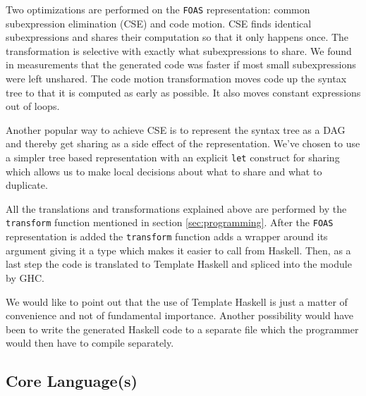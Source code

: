 \documentclass[preprint]{sigplanconf}
\begin{document}
Two optimizations are performed on the \texttt{FOAS} representation:
common subexpression elimination (CSE) and code motion. CSE finds
identical subexpressions and shares their computation so that it only
happens once. The transformation is selective with exactly what
subexpressions to share. We found in measurements that the generated
code was faster if most small subexpressions were left unshared. The
code motion transformation moves code up the syntax tree to that it is
computed as early as possible. It also moves constant expressions out of
loops.

Another popular way to achieve CSE is to represent the syntax tree as a
DAG and thereby get sharing as a side effect of the representation.
We've chosen to use a simpler tree based representation with an explicit
\texttt{let} construct for sharing which allows us to make local
decisions about what to share and what to duplicate.

All the translations and transformations explained above are performed
by the \texttt{transform} function mentioned in section
\ref{sec:programming}. After the \texttt{FOAS} representation is added
the \texttt{transform} function adds a wrapper around its argument
giving it a type which makes it easier to call from Haskell. Then, as a
last step the code is translated to Template Haskell and spliced into
the module by GHC.

We would like to point out that the use of Template Haskell is just a
matter of convenience and not of fundamental importance. Another
possibility would have been to write the generated Haskell code to a
separate file which the programmer would then have to compile
separately.

\subsection{Core Language(s)}
\end{document}
